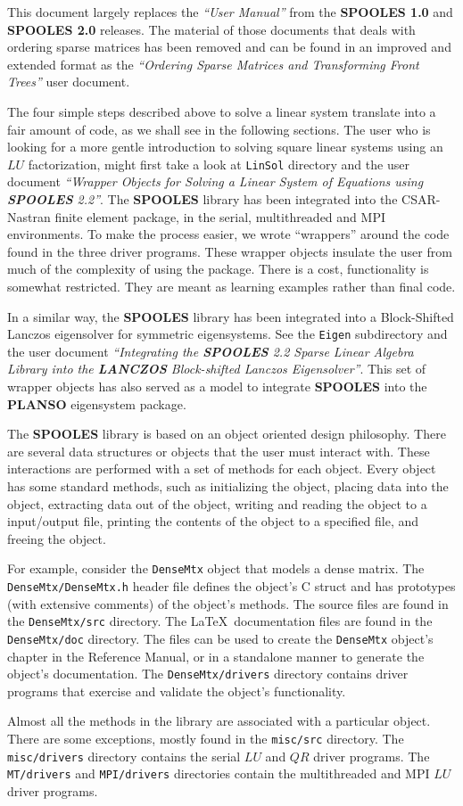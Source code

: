 This document largely replaces the {\it ``User Manual''} from the 
{\bf SPOOLES 1.0} and {\bf SPOOLES 2.0} releases.
The material of those documents that deals with ordering sparse
matrices has been removed and can be found in an improved and 
extended format as
the {\it ``Ordering Sparse Matrices and Transforming Front Trees''}
user document.
\par
The four simple steps described above to solve a linear system
translate into a fair amount of code, as we shall see in the
following sections.
The user who is looking for a more gentle introduction to solving
square linear systems using an $LU$ factorization, might first take
a look at {\tt LinSol} directory and the user document
{\it ``Wrapper Objects for Solving a Linear System of Equations
using {\bf SPOOLES} 2.2''}.
The {\bf SPOOLES} library has been integrated into the CSAR-Nastran
finite element package, in the serial, multithreaded and MPI
environments.
To make the process easier, we wrote ``wrappers'' around the 
code found in the three driver programs.
These wrapper objects insulate the user from much of the
complexity of using the package. 
There is a cost, functionality is somewhat restricted.
They are meant as learning examples rather than final code.
\par
In a similar way, the {\bf SPOOLES} library has been integrated
into a Block-Shifted Lanczos eigensolver for symmetric
eigensystems.
See the {\tt Eigen} subdirectory and the user document
{\it ``Integrating the {\bf SPOOLES} 2.2 Sparse Linear Algebra
Library into the {\bf LANCZOS} Block-shifted Lanczos Eigensolver''}.
This set of wrapper objects has also served as a model to
integrate {\bf SPOOLES} into the {\bf PLANSO} eigensystem package.
\par
The {\bf SPOOLES} library is based on an object
oriented design philosophy.  
There are several data structures or objects
that the user must interact with.  
These interactions are performed
with a set of methods for each object.  
Every object has some standard
methods, such as initializing the object, placing data into the object,
extracting data out of the object, writing and reading the object to a 
input/output file, printing the contents of the object to a specified 
file, and freeing the object.  
\par
For example, consider the {\tt DenseMtx} object that models a dense
matrix.
The {\tt DenseMtx/DenseMtx.h} header file defines the object's C 
struct and has prototypes (with extensive comments) of the object's 
methods.
The source files are found in the 
{\tt DenseMtx/src} directory.
The \LaTeX\ documentation files are found in the 
{\tt DenseMtx/doc} directory.
The files can be used to create the {\tt DenseMtx} object's chapter
in the Reference Manual, or in a standalone manner to generate the
object's documentation.
The {\tt DenseMtx/drivers} directory contains driver programs that
exercise and validate the object's functionality.
\par
Almost all the methods in the library are associated with a
particular object.
There are some exceptions, mostly found in the {\tt misc/src}
directory. 
The {\tt misc/drivers} directory contains the serial $LU$ and $QR$
driver programs.
The {\tt MT/drivers} and {\tt MPI/drivers} directories contain 
the multithreaded and MPI $LU$ driver programs.
